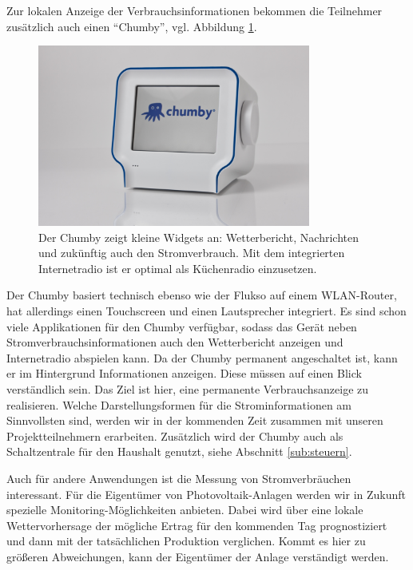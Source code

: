 \documentclass[12pt,BCOR=8.5mm]{scrartcl}
\newcommand*\imgwidth{0.8\textwidth}
\begin{document}
Zur lokalen Anzeige der Verbrauchsinformationen bekommen die Teilnehmer
zusätzlich auch einen "`Chumby"', vgl. Abbildung \ref{fig:chumby}. 
\begin{figure}[htbp]
  \begin{center}
    \includegraphics[width=\imgwidth]{figures/chumby.jpg}
    \caption{Der Chumby zeigt kleine Widgets an: Wetterbericht,
    Nachrichten und zukünftig auch den Stromverbrauch. Mit dem
    integrierten Internetradio ist er optimal als Küchenradio
    einzusetzen.}
    \label{fig:chumby}
  \end{center}
\end{figure}
Der Chumby basiert technisch ebenso wie der Flukso auf einem
WLAN-Router, hat allerdings einen Touchscreen und einen Lautsprecher
integriert. Es sind schon viele Applikationen für den Chumby verfügbar,
sodass das Gerät neben Stromverbrauchsinformationen auch den
Wetterbericht anzeigen und Internetradio abspielen kann. Da der Chumby
permanent angeschaltet ist, kann er im Hintergrund Informationen
anzeigen. Diese müssen auf einen Blick verständlich sein. Das Ziel ist
hier, eine permanente Verbrauchsanzeige zu realisieren.  Welche
Darstellungsformen für die Strominformationen am Sinnvollsten sind,
werden wir in der kommenden Zeit zusammen mit unseren Projektteilnehmern
erarbeiten. Zusätzlich wird der Chumby auch als Schaltzentrale für den
Haushalt genutzt, siehe Abschnitt \ref{sub:steuern}.

Auch für andere Anwendungen ist die Messung von Stromverbräuchen
interessant. Für die Eigentümer von Photovoltaik-Anlagen werden wir in
Zukunft spezielle Monitoring-Möglichkeiten anbieten. Dabei wird über
eine lokale Wettervorhersage der mögliche Ertrag für den kommenden Tag
prognostiziert und dann mit der tatsächlichen Produktion verglichen.
Kommt es hier zu größeren Abweichungen, kann der Eigentümer der Anlage
verständigt werden.
\end{document}
